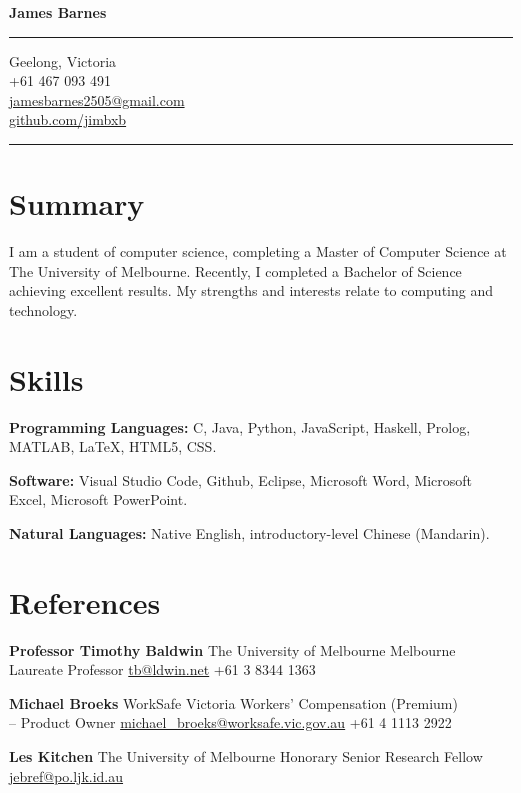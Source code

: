 \documentclass[10pt]{article}
\newcommand{\reference}[5]{
    \textbf{#1} \newline
    {\footnotesize #2} \newline
    #3 \newline
    \href{mailto:#4}{#4} \newline
    #5 \newline
}
\newcommand{\skills}[2]{
    \textbf{#1} \newline
    #2
}
\begin{document}
\pagestyle{empty} 

\begin{minipage}[t]{.35\textwidth}
\vspace*{0pt}

\begin{center}
{\Huge \bfseries James Barnes\par}
\end{center}

\bigskip
\hrule
\bigskip

\begin{center}
Geelong, Victoria \\
+61 467 093 491 \\
\href{mailto:jamesbarnes2505@gmail.com}{jamesbarnes2505@gmail.com} \\
\href{http://github.com/jimbxb}{github.com/jimbxb}
\end{center}

\bigskip
\hrule
\bigskip

\section{Summary}

\begin{flushleft}
I am a student of computer science, completing a Master of Computer Science at The University of Melbourne. 
Recently, I completed a Bachelor of Science achieving excellent results.
My strengths and interests relate to computing and technology.
\end{flushleft} 

\medskip

\section{Skills}

\skills{Programming Languages:}
{C, Java, Python, JavaScript, Haskell, Prolog, MATLAB, {\fontfamily{cmr}\selectfont \LaTeX{}}, HTML5, CSS. \newline }

\skills{Software:}
{Visual Studio Code, Github, Eclipse, Microsoft Word, Microsoft Excel, Microsoft PowerPoint. \newline }

\skills{Natural Languages:}
{Native English, introductory-level Chinese (Mandarin).}

\medskip

\section{References}

\reference{Professor Timothy Baldwin}
{The University of Melbourne}
{Melbourne Laureate Professor}
{tb@ldwin.net}
{+61 3 8344 1363}

\reference{Michael Broeks}
{WorkSafe Victoria}
{Workers' Compensation (Premium) \\ -- Product Owner}
{michael\_broeks@worksafe.vic.gov.au}
{+61 4 1113 2922}

\reference{Les Kitchen}
{The University of Melbourne}
{Honorary Senior Research Fellow}
{jebref@po.ljk.id.au}
{}

\end{minipage}\hfill
\end{document}
